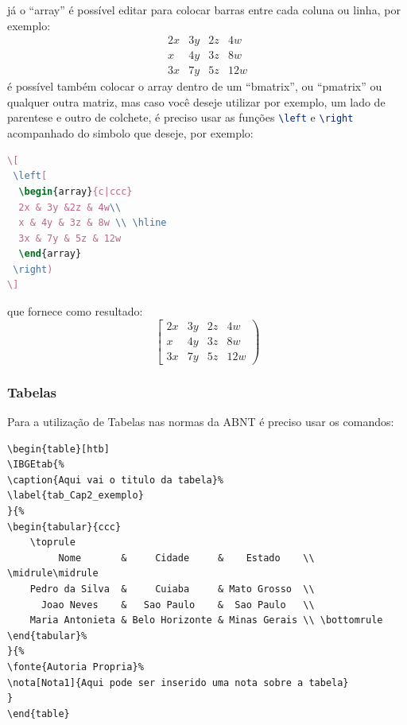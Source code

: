 já o ``array'' é possível editar para colocar barras entre cada coluna ou linha, por exemplo:
\[
\begin{array}{c|ccc}
2x & 3y &2z & 4w\\ 
x & 4y & 3z & 8w \\ \hline
3x & 7y & 5z & 12w
\end{array}
\]
é possível também colocar o array dentro de um ``bmatrix'', ou ``pmatrix'' ou qualquer outra matriz, mas caso você deseje utilizar por exemplo, um lado de parentese e outro de colchete, é preciso usar as funções \lstinline[language=TeX]|\left| e \lstinline[language=TeX]|\right| acompanhado do simbolo que deseje, por exemplo:
\begin{lstlisting}[language=TeX]
\[
 \left[
  \begin{array}{c|ccc}
  2x & 3y &2z & 4w\\ 
  x & 4y & 3z & 8w \\ \hline
  3x & 7y & 5z & 12w
  \end{array}
 \right)
\]
\end{lstlisting}
que fornece como resultado:
\[
\left[
\begin{array}{c|ccc}
2x & 3y &2z & 4w\\ 
x & 4y & 3z & 8w \\ \hline
3x & 7y & 5z & 12w
\end{array}
\right)
\]

\subsubsection{Tabelas}
Para a utilização de Tabelas nas normas da ABNT é preciso usar os comandos:




\begin{lstlisting}
\begin{table}[htb]
\IBGEtab{%
\caption{Aqui vai o titulo da tabela}%
\label{tab_Cap2_exemplo}
}{%
\begin{tabular}{ccc}
	\toprule
	     Nome       &     Cidade     &    Estado    \\ \midrule\midrule
	Pedro da Silva  &     Cuiaba     & Mato Grosso  \\
	  Joao Neves    &   Sao Paulo    &  Sao Paulo   \\
	Maria Antonieta & Belo Horizonte & Minas Gerais \\ \bottomrule
\end{tabular}%
}{%
\fonte{Autoria Propria}%
\nota[Nota1]{Aqui pode ser inserido uma nota sobre a tabela}
}
\end{table}
\end{lstlisting}

